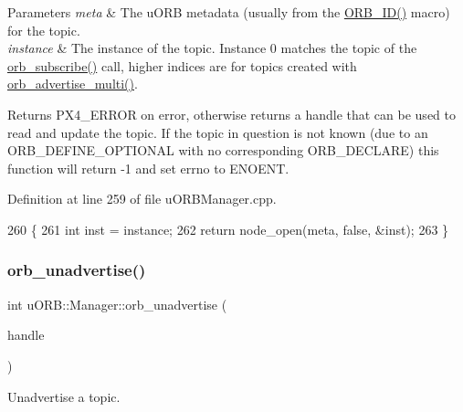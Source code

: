 \begin{DoxyParams}{Parameters}
{\em meta} & The u\+O\+RB metadata (usually from the \hyperlink{uORB_8h_a96af5434ec1acdf24287bd7851b0413f}{O\+R\+B\+\_\+\+I\+D()} macro) for the topic. \\
\hline
{\em instance} & The instance of the topic. Instance 0 matches the topic of the \hyperlink{classuORB_1_1Manager_ae54072a80ad4de6d127e2dad8182b8fb}{orb\+\_\+subscribe()} call, higher indices are for topics created with \hyperlink{classuORB_1_1Manager_a808104f7ebeab8f0d548dd9127344b24}{orb\+\_\+advertise\+\_\+multi()}. \\
\hline
\end{DoxyParams}
\begin{DoxyReturn}{Returns}
P\+X4\+\_\+\+E\+R\+R\+OR on error, otherwise returns a handle that can be used to read and update the topic. If the topic in question is not known (due to an O\+R\+B\+\_\+\+D\+E\+F\+I\+N\+E\+\_\+\+O\+P\+T\+I\+O\+N\+AL with no corresponding O\+R\+B\+\_\+\+D\+E\+C\+L\+A\+RE) this function will return -\/1 and set errno to E\+N\+O\+E\+NT. 
\end{DoxyReturn}


Definition at line 259 of file u\+O\+R\+B\+Manager.\+cpp.


\begin{DoxyCode}
260 \{
261     \textcolor{keywordtype}{int} inst = instance;
262     \textcolor{keywordflow}{return} node\_open(meta, \textcolor{keyword}{false}, &inst);
263 \}
\end{DoxyCode}
\mbox{\label{classuORB_1_1Manager_a45601ddc722320b9cd660d9548263824}} 
\subsubsection{\texorpdfstring{orb\+\_\+unadvertise()}{orb\_unadvertise()}}
{\footnotesize\ttfamily int u\+O\+R\+B\+::\+Manager\+::orb\+\_\+unadvertise (\begin{DoxyParamCaption}\item[{\hyperlink{uORB_8h_a8d0cfa5f9ea6427a37057d6cea6dd990}{orb\+\_\+advert\+\_\+t}}]{handle }\end{DoxyParamCaption})}

Unadvertise a topic.


